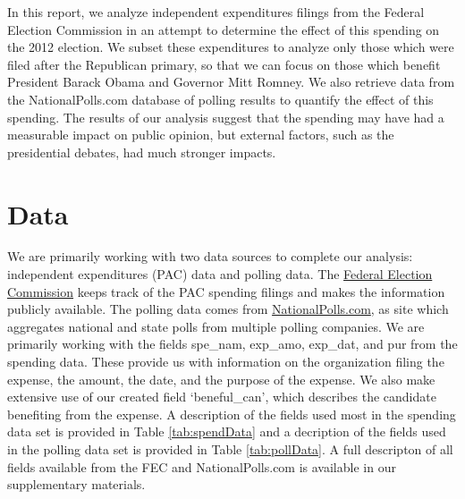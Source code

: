 \documentclass[11pt]{article}\usepackage{graphicx, color}
\begin{document}
In this report, we analyze independent expenditures filings from the Federal Election Commission in an attempt to determine the effect of this spending on the 2012 election.  We subset these expenditures to analyze only those which were filed after the Republican primary, so that we can focus on those which benefit President Barack Obama and Governor Mitt Romney. We also retrieve data from the NationalPolls.com database of polling results to quantify the effect of this spending. The results of our analysis suggest that the spending may have had a measurable impact on public opinion, but external factors, such as the presidential debates, had much stronger impacts.






\section{Data}
We are primarily working with two data sources to complete our analysis: independent expenditures (PAC) data and polling data. The \href{http://www.fec.gov/data/IndependentExpenditure.do?format=html&cf=superPAC}{Federal Election Commission} keeps track of the PAC spending filings and makes the information publicly available. The polling data comes from \href{http://nationalpolls.com/}{NationalPolls.com}, as site which aggregates national and state polls from multiple polling companies. We are primarily working with the fields spe\_nam, exp\_amo, exp\_dat, and pur from the spending data. These provide us with information on the organization filing the expense, the amount, the date, and the purpose of the expense. We also make extensive use of our created field `beneful\_can', which describes the candidate benefiting from the expense. A description of the fields used most in the spending data set is provided in Table \ref{tab:spendData} and a decription of the fields used in the polling data set is provided in Table \ref{tab:pollData}. A full descripton of all fields available from the FEC and NationalPolls.com is available in our supplementary materials.
\end{document}
